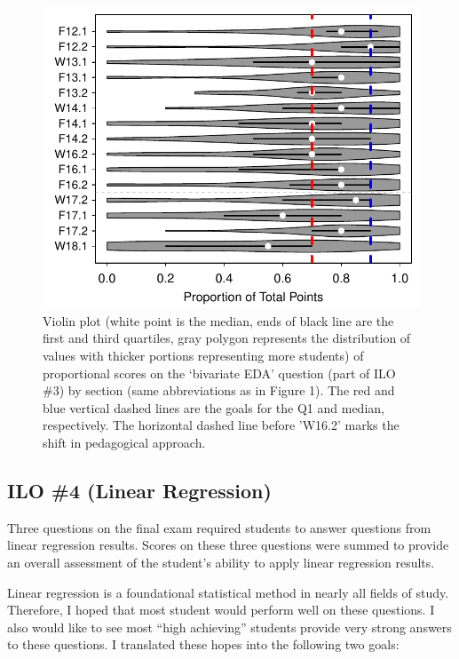 \documentclass{article}\usepackage[]{graphicx}\usepackage[]{color}
\newenvironment{knitrout}{}{} %
\begin{document}
\begin{knitrout}
\color{fgcolor}\begin{figure}[h]

{\centering \includegraphics[width=.6\linewidth]{Figs/BEDAQBar-1} 

}

\caption[Violin plot (white point is the median, ends of black line are the first and third quartiles, gray polygon represents the distribution of values with thicker portions representing more students) of proportional scores on the `bivariate EDA' question (part of ILO \#3) by section (same abbreviations as in Figure 1)]{Violin plot (white point is the median, ends of black line are the first and third quartiles, gray polygon represents the distribution of values with thicker portions representing more students) of proportional scores on the `bivariate EDA' question (part of ILO \#3) by section (same abbreviations as in Figure 1). The red and blue vertical dashed lines are the goals for the Q1 and median, respectively. The horizontal dashed line before 'W16.2' marks the shift in pedagogical approach.}\label{fig:BEDAQBar}
\end{figure}


\end{knitrout}



\clearpage
\subsection{ILO \#4 (Linear Regression)}
Three questions on the final exam required students to answer questions from linear regression results. Scores on these three questions were summed to provide an overall assessment of the student's ability to apply linear regression results.

Linear regression is a foundational statistical method in nearly all fields of study. Therefore, I hoped that most student would perform well on these questions. I also would like to see most ``high achieving'' students provide very strong answers to these questions. I translated these hopes into the following two goals:
\end{document}

